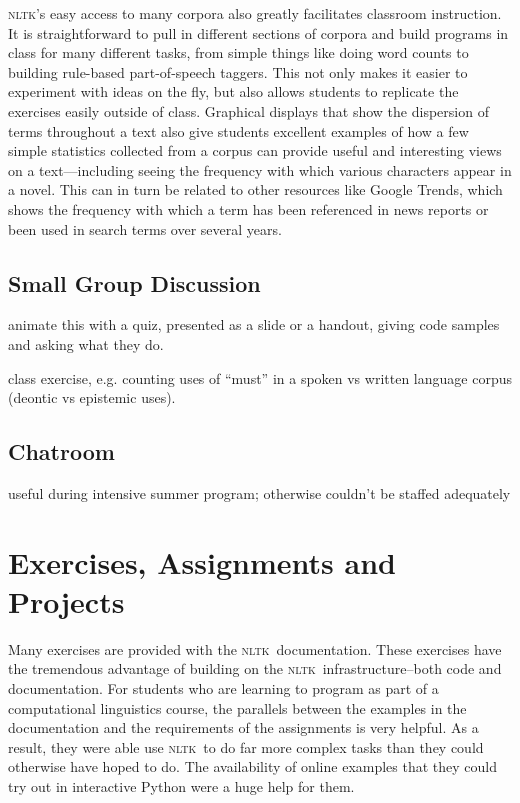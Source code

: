 \documentclass[11pt]{article}
\newcommand{\NLTK}{\textsc{nltk}}
\begin{document}
\NLTK's easy access to many corpora also greatly facilitates classroom
instruction. It is straightforward to pull in different sections of
corpora and build programs in class for many different tasks, from
simple things like doing word counts to building rule-based
part-of-speech taggers. This not only makes it easier to experiment
with ideas on the fly, but also allows students to replicate the
exercises easily outside of class. Graphical displays that show the
dispersion of terms throughout a text also give students excellent
examples of how a few simple statistics collected from a corpus can
provide useful and interesting views on a text---including seeing the
frequency with which various characters appear in a novel. This can in
turn be related to other resources like Google Trends, which shows the
frequency with which a term has been referenced in news reports or
been used in search terms over several years.


\subsection{Small Group Discussion}

animate this with a quiz, presented as a slide or a handout, giving code samples and asking what they do.

class exercise, e.g. counting uses of ``must'' in a spoken vs written language corpus
(deontic vs epistemic uses).

\subsection{Chatroom}

useful during intensive summer program; otherwise couldn't be staffed adequately

\section{Exercises, Assignments and Projects}
\label{sec:projects}

Many exercises are provided with the \NLTK\ documentation. These
exercises have the tremendous advantage of building on the \NLTK\
infrastructure--both code and documentation. For students who are
learning to program as part of a computational linguistics course, the
parallels between the examples in the documentation and the
requirements of the assignments is very helpful. As a result, they
were able use \NLTK\ to do far more complex tasks than they could
otherwise have hoped to do. The availability of online examples that
they could try out in interactive Python were a huge help for them.
\end{document}
